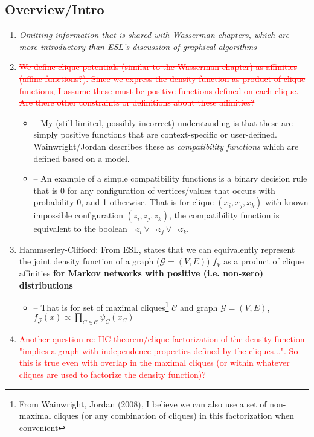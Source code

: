 \documentclass[11pt]{article}
\begin{document}


\subsection*{Overview/Intro}
\begin{enumerate}
    \item \textit{Omitting information that is shared with Wasserman chapters, which are more introductory than ESL's discussion of graphical algorithms}
    \item \textcolor{red}{\sout{We define clique potentials (similar to the Wasserman chapter) as affinities (affine functions?). Since we express the density function as product of clique functions, I assume these must be positive functions defined on each clique. Are there other constraints or definitions about these affinities?}}
    	\begin{itemize}
            \item -- My (still limited, possibly incorrect) understanding is that these are simply positive functions that are context-specific or user-defined. Wainwright/Jordan describes these as {\it compatibility functions} which are defined based on a model. 
    	    \item -- An example of a simple compatibility functions is a binary decision rule that is 0 for any configuration of vertices/values that occurs with probability 0, and 1 otherwise. That is for clique $(x_i, x_j, x_k)$ with known impossible configuration $(z_i, z_j, z_k)$, the compatibility function is equivalent to the boolean $\lnot z_i \lor \lnot z_j \lor \lnot z_k$.
        \end{itemize}
    \item Hammserley-Clifford: From ESL, states that we can equivalently represent the joint density function of a graph ($\mathcal{G} = (V,E)$) $f_V$ as a product of clique affinities {\bf for Markov networks with positive (i.e. non-zero) distributions}
    \begin{itemize}
        \item -- That is for set of maximal cliques\footnote{
            From Wainwright, Jordan (2008), I believe we can also use a set of non-maximal cliques (or any combination of cliques) in this factorization when convenient
            } $\mathcal{C}$ and graph $\mathcal{G} = (V, E)$, $f_\mathcal{G}(x) \propto \prod_{C \in \mathcal{C}}\psi_C (x_C)$
    \end{itemize}

    \item \textcolor{red}{Another question re: HC theorem/clique-factorization of the density function "implies a graph with independence properties defined by the cliques...". So this is true even with overlap in the maximal cliques (or within whatever cliques are used to factorize the density function)? }
        
    
\end{enumerate}
\end{document}
